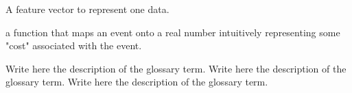 %
%


 A feature vector to represent one data.

 a function that maps an event onto a real number intuitively representing some "cost" associated with the event.

 Write here the description of the glossary term. Write here the description of the glossary term. Write here the description of the glossary term.
